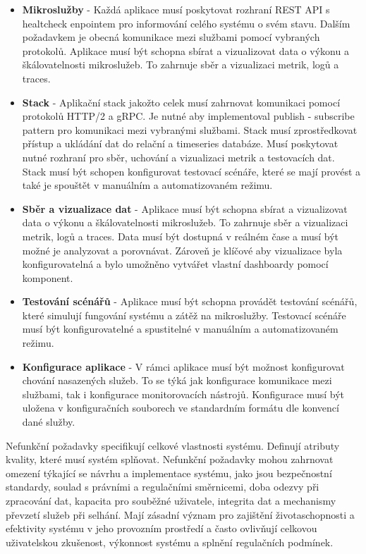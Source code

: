 \begin{itemize}
  \item \textbf{Mikroslužby} - Každá aplikace musí poskytovat rozhraní REST API s healtcheck enpointem pro informování celého systému o svém stavu. Dalším požadavkem je obecná komunikace mezi službami pomocí vybraných protokolů. Aplikace musí být schopna sbírat a vizualizovat data o výkonu a škálovatelnosti mikroslužeb. To zahrnuje sběr a vizualizaci metrik, logů a traces.
  \item \textbf{Stack} - Aplikační stack jakožto celek musí zahrnovat komunikaci pomocí protokolů HTTP/2 a gRPC. Je nutné aby implementoval publish - subscribe pattern pro komunikaci mezi vybranými službami. Stack musí zprostředkovat přístup a ukládání dat do relační a timeseries databáze. Musí poskytovat nutné rozhraní pro sběr, uchování a vizualizaci metrik a testovacích dat. Stack musí být schopen konfigurovat testovací scénáře, které se mají provést a také je spouštět v manuálním a automatizovaném režimu.
  \item \textbf{Sběr a vizualizace dat} - Aplikace musí být schopna sbírat a vizualizovat data o výkonu a škálovatelnosti mikroslužeb. To zahrnuje sběr a vizualizaci metrik, logů a traces. Data musí být dostupná v reálném čase a musí být možné je analyzovat a porovnávat. Zároveň je klíčové aby vizualizace byla konfigurovatelná a bylo umožněno vytvářet vlastní dashboardy pomocí komponent.
  \item \textbf{Testování scénářů} - Aplikace musí být schopna provádět testování scénářů, které simulují fungování systému a zátěž na mikroslužby. Testovací scénáře musí být konfigurovatelné a spustitelné v manuálním a automatizovaném režimu. 
  \item \textbf{Konfigurace aplikace} - V rámci aplikace musí být možnost konfigurovat chování nasazených služeb. To se týká jak konfigurace komunikace mezi službami, tak i konfigurace monitorovacích nástrojů. Konfigurace musí být uložena v konfiguračních souborech ve standardním formátu dle konvencí dané služby.
\end{itemize}


Nefunkční požadavky specifikují celkové vlastnosti systému. Definují atributy kvality, které musí systém splňovat. Nefunkční požadavky mohou zahrnovat omezení týkající se návrhu a implementace systému, jako jsou bezpečnostní standardy, soulad s právními a regulačními směrnicemi, doba odezvy při zpracování dat, kapacita pro souběžné uživatele, integrita dat a mechanismy převzetí služeb při selhání. Mají zásadní význam pro zajištění životaschopnosti a efektivity systému v jeho provozním prostředí a často ovlivňují celkovou uživatelskou zkušenost, výkonnost systému a splnění regulačních podmínek.

